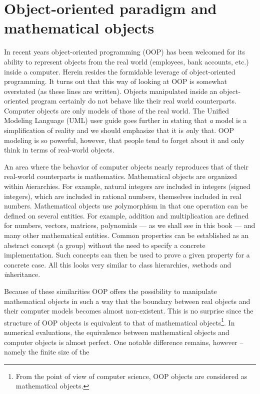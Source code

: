 \section{Object-oriented paradigm and mathematical objects}
In recent years object-oriented programming (OOP) has been welcomed for its
ability to represent objects from the real world (employees, bank accounts,
etc.) inside a computer.
Herein resides the formidable leverage of object-oriented
programming.
It turns out that this way of looking at OOP is somewhat overstated (as these
lines are written).
Objects manipulated inside an object-oriented program certainly do not
behave like their real world counterparts. Computer objects are
only models of those of the real world. The Unified Modeling Language (UML) user
guide goes further in stating that {\textit a model is a simplification of
reality} and we should emphasize that it is {\textsl only that}. OOP
modeling is so powerful, however, that people tend to forget about
it and only think in terms of real-world objects.
\par
An area where the behavior of computer objects nearly reproduces
that of their real-world counterparts is mathematics. Mathematical
objects are organized within {\textit hierarchies}. For example,
natural integers are included in integers (signed integers), which
are included in rational numbers, themselves included in real
numbers. Mathematical objects use {\textit polymorphism} in that one
operation can be defined on several entities. For example,
addition and multiplication are defined for numbers, vectors,
matrices, polynomials --- as we shall see in this book --- and
many other mathematical entities. Common properties can be
established as an abstract concept (\eg a group) without the
need to specify a concrete implementation. Such concepts can then
be used to prove a given property for a concrete case. All this
looks very similar to {\textsl class hierarchies}, {\textsl methods} and
{\textsl inheritance}.
\par
Because of these similarities OOP offers the possibility to
manipulate mathematical objects in such a way that the boundary
between real objects and their computer models becomes almost
non-existent. This is no surprise since the structure of OOP
objects is equivalent to that of mathematical
objects\footnote{From the point of view of computer science, OOP
objects are considered as mathematical objects.}. In numerical evaluations,
the equivalence between mathematical
objects and computer objects is almost perfect. One notable
difference remains, however -- namely the finite size of the
